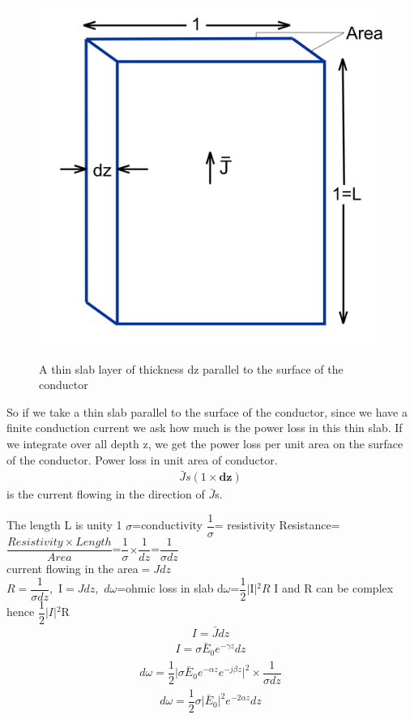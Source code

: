 \begin{figure}
\centering
\textsc{\includegraphics[scale=0.3]{./graphics/Bello283}}
\caption{A thin slab layer of thickness dz parallel to the surface of the conductor }
\end{figure}
So if we take a thin slab parallel to the surface of the conductor, since we have a finite conduction current we ask how much is the power loss in this thin slab. If we integrate over all depth z, we get the power loss per unit area on the surface of the conductor.
Power loss in unit area of conductor.
\begin{align*}
\bar{J}s(1\times\textbf{dz})
\end{align*}
is the current flowing in the direction of  $\bar{J}$s.
\begin{center}
The length L is unity 1
$\sigma$=conductivity
$\dfrac{1}{\sigma}$= resistivity
Resistance=$\dfrac{Resistivity \times Length}{Area}$=$\dfrac{1}{\sigma}$$\times$$\dfrac{1}{dz}$=$\dfrac{1}{\sigma dz}$\\
current flowing in the area$=Jdz$\\
$R=\dfrac{1}{\sigma dz}$,\ I$=Jdz$,\ $d\omega$=ohmic loss in slab
d$\omega$=$\dfrac{1}{2}$$\lvert$I$\rvert$$^{2}R$
I and R can be complex hence $\dfrac{1}{2}$$\lvert$$I\rvert$$^{2}$R
\begin{align*}
I=\bar{J}dz
\end{align*}
\begin{align*}
I=\sigma\bar{E}_{0}e^{-\gamma z}dz
\end{align*}
\begin{align*}
d\omega=\dfrac{1}{2}\lvert\sigma\bar{E}_{0}e^{-\alpha z}e^{-j\beta z}\rvert^{2}\times\dfrac{1}{\sigma dz}
\end{align*}
\begin{align*}
d\omega=\dfrac{1}{2}\sigma\lvert\bar{E}_{0}\rvert^{2}e^{-2\alpha z}dz
\end{align*}
\end{center}
